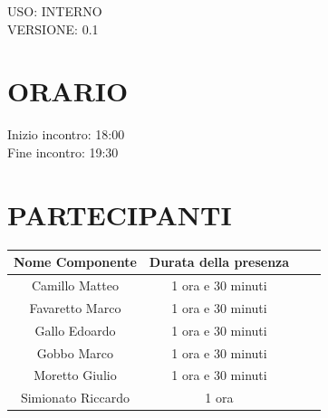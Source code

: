 \documentclass[5pt]{article}
\begin{document}
\begin{flushright}
    \begin{spacing}{1}
        USO: INTERNO\\
        VERSIONE: 0.1\\ %
    \end{spacing}
\end{flushright}


\restoregeometry

\pagebreak


\section{\Large ORARIO}
\begin{spacing}{1.5}
    {\large Inizio incontro: 18:00}\\
    {\large Fine incontro: 19:30}
\end{spacing}

\section{PARTECIPANTI}
\setlength\cellspacetoplimit{6pt}
\setlength\cellspacebottomlimit{6pt}

\begin{table}[ht]
  \begin{tabular}{|Sc|Sc|}
    \hline
    \textbf{Nome Componente} & \textbf{Durata della presenza} \\
    \hline
    Camillo Matteo & 1 ora e 30 minuti \\
    Favaretto Marco & 1 ora e 30 minuti \\
    Gallo Edoardo & 1 ora e 30 minuti \\
    Gobbo Marco & 1 ora e 30 minuti \\
    Moretto Giulio & 1 ora e 30 minuti \\
    Simionato Riccardo & 1 ora \\
    \hline
  \end{tabular}
  \label{tab:conference}
\end{table}
\end{document}
